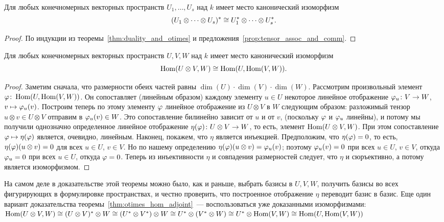 \begin{corollary}
Для любых конечномерных векторных пространств $U_1,\dots,U_s$ над $k$
имеет место канонический изоморфизм
$$
(U_1\otimes\dots\otimes U_s)^*\cong U_1^*\otimes\dots\otimes U_s^*.
$$
\end{corollary}
\begin{proof}
По индукции из теоремы~\ref{thm:duality_and_otimes} и
предложения~\ref{prop:tensor_assoc_and_comm}.
\end{proof}

\begin{theorem}\label{thm:otimes_hom_adjoint}
Для любых конечномерных векторных пространств $U,V,W$ над $k$ имеет
место канонический изоморфизм
$$
\operatorname{Hom}(U\otimes V,W)\cong\operatorname{Hom}(U,\operatorname{Hom}(V,W)).
$$
\end{theorem}
\begin{proof}
Заметим сначала, что размерности обеих частей равны
$\dim(U)\cdot\dim(V)\cdot\dim(W)$. Рассмотрим произвольный элемент
$\varphi\colon\operatorname{Hom}(U,\operatorname{Hom}(V,W))$. Он сопоставляет (линейным образом)
каждому элементу $u\in U$ некоторое линейное отображение
$\varphi_u\colon V\to W$, $v\mapsto\varphi_u(v)$. Построим теперь по этому
элементу $\varphi$ линейное отображение из $U\otimes V$ в $W$ следующим
образом: разложимый тензор $u\otimes v\in U\otimes V$ отправим в
$\varphi_u(v)\in W$. Это сопоставление билинейно зависит от $u$ и от $v$,
(поскольку $\varphi$ и $\varphi_u$ линейны), и потому мы получили однозначно
определенное линейное отображение $\eta(\varphi)\colon U\otimes V\to W$,
то есть, элемент $\operatorname{Hom}(U\otimes V, W)$. При этом сопоставление
$\varphi\mapsto\eta(\varphi)$ является, очевидно, линейным.
Наконец, покажем, что $\eta$ является инъекцией. Предположим, что
$\eta(\varphi)=0$, то есть, $\eta(\varphi)(u\otimes v)=0$ для всех $u\in U$,
$v\in V$. Но по нашему определению $\eta(\varphi)(u\otimes v) = \varphi_u(v)$;
поэтому $\varphi_u(v)=0$ при всех $u\in U$, $v\in V$, откуда $\varphi_u=0$ при
всех $u\in U$, откуда $\varphi=0$.
Теперь из инъективности $\eta$ и совпадения размерностей следует, что
$\eta$ и сюръективно, а потому является изоморфизмом.
\end{proof}

На самом деле в доказательстве этой теоремы можно было, как и раньше,
выбрать базисы в $U,V,W$, получить базисы во всех фигурирующих в
формулировке пространствах, и честно проверить, что построенное
отображение $\eta$ переводит базис в базис. Еще один вариант
доказательства теоремы~\ref{thm:otimes_hom_adjoint}~---
воспользоваться уже доказанными изоморфизмами:
$\operatorname{Hom}(U\otimes V,W)\cong (U\otimes V)^*\otimes W\cong
(U^*\otimes V^*)\otimes W\cong U^*\otimes(V^*\otimes W)
\cong U^*\otimes\operatorname{Hom}(V,W) \cong\operatorname{Hom}(U,\operatorname{Hom}(V,W))$

